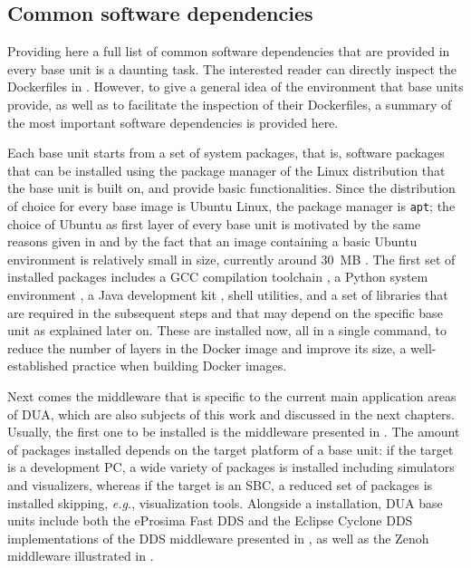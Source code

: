 \subsection{Common software dependencies}
\label{sec:dua_common_dependencies}
Providing here a full list of common software dependencies that are provided in every base unit is a daunting task. The interested reader can directly inspect the Dockerfiles in \cite{masocco_dua-foundation_nodate}. However, to give a general idea of the environment that base units provide, as well as to facilitate the inspection of their Dockerfiles, a summary of the most important software dependencies is provided here.

Each base unit starts from a set of system packages, that is, software packages that can be installed using the package manager of the Linux distribution that the base unit is built on, and provide basic functionalities. Since the distribution of choice for every base image is Ubuntu Linux, the package manager is \texttt{apt}; the choice of Ubuntu as first layer of every base unit is motivated by the same reasons given in  and by the fact that an image containing a basic Ubuntu environment is relatively small in size, currently around \SI{30}{MB} \cite{canonical_ubuntu_nodate-1}. The first set of installed packages includes a GCC compilation toolchain \cite{free_software_foundation_gcc_nodate}, a Python system environment \cite{van_rossum_python_nodate}, a Java development kit \cite{oracle_java_nodate}, shell utilities, and a set of libraries that are required in the subsequent steps and that may depend on the specific base unit as explained later on. These are installed now, all in a single command, to reduce the number of layers in the Docker image and improve its size, a well-established practice when building Docker images.

Next comes the middleware that is specific to the current main application areas of DUA, which are also subjects of this work and discussed in the next chapters. Usually, the first one to be installed is the \ROS middleware presented in . The amount of \ROS packages installed depends on the target platform of a base unit: if the target is a development PC, a wide variety of packages is installed including simulators and visualizers, whereas if the target is an SBC, a reduced set of packages is installed skipping, \emph{e.g.}, visualization tools. Alongside a \ROS installation, DUA base units include both the eProsima Fast DDS \cite{eprosima_fast_nodate} and the Eclipse Cyclone DDS \cite{eclipse_foundation_cyclone_nodate} implementations of the DDS middleware presented in , as well as the Zenoh middleware illustrated in .

